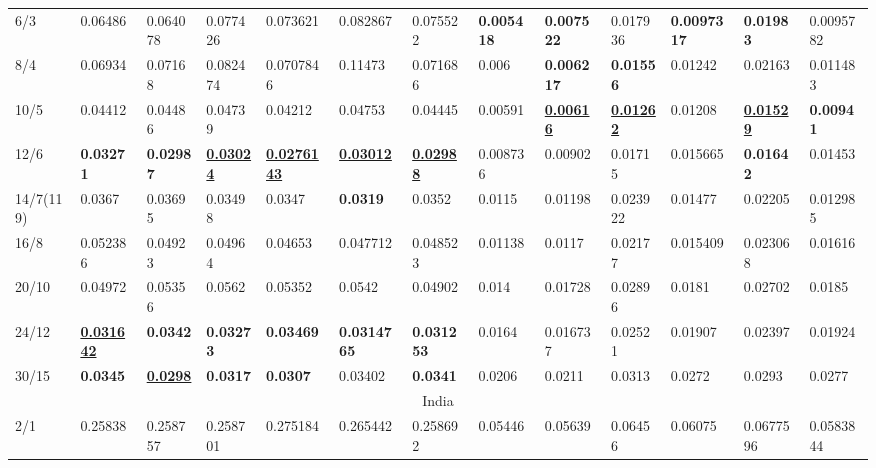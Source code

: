 \begin{landscape}
\begin{table}[]
{\begin{tabular}{@{}lllllllllllll@{}}
6/3 & 0.06486 & 0.064078 & 0.077426 & 0.073621 & 0.082867 & 0.075522 & {\color[HTML]{32CB00} \textbf{0.005418}} & {\color[HTML]{34FF34} \textbf{0.007522}} & 0.017936 & {\color[HTML]{34FF34} \textbf{0.0097317}} & {\color[HTML]{34FF34} \textbf{0.01983}} & 0.0095782 \\
8/4 & 0.06934 & 0.07168 & 0.082474 & 0.0707846 & 0.11473 & 0.071686 & 0.006 & {\color[HTML]{32CB00} \textbf{0.006217}} & {\color[HTML]{34FF34} \textbf{0.01556}} & 0.01242 & 0.02163 & 0.011483 \\
10/5 & 0.04412 & 0.04486 & 0.04739 & 0.04212 & 0.04753 & 0.04445 & 0.00591 & {\color[HTML]{009901} {\ul\textbf{0.00616}}} & {\color[HTML]{009901} {\ul\textbf{0.01262}}} & 0.01208 & {\color[HTML]{009901} {\ul\textbf{0.01529}}} & {\color[HTML]{34FF34} \textbf{0.00941}} \\
12/6 & {\color[HTML]{32CB00} \textbf{0.03271}} & {\color[HTML]{32CB00} \textbf{0.02987}} & {\color[HTML]{009901} {\ul\textbf{0.03024}}} & {\color[HTML]{009901} {\ul\textbf{0.0276143}}} & {\color[HTML]{009901} {\ul\textbf{0.03012}}} & {\color[HTML]{009901} {\ul\textbf{0.02988}}} & 0.008736 & 0.00902 & 0.01715 & 0.015665 & {\color[HTML]{32CB00} \textbf{0.01642}} & 0.01453 \\
14/7(119\textendash0) & 0.0367 & 0.03695 & 0.03498 & 0.0347 & {\color[HTML]{34FF34} \textbf{0.0319}} & 0.0352 & 0.0115 & 0.01198 & 0.023922 & 0.01477 & 0.02205 & 0.012985 \\
16/8 & 0.052386 & 0.04923 & 0.04964 & 0.04653 & 0.047712 & 0.048523 & 0.01138 & 0.0117 & 0.02177 & 0.015409 & 0.023068 & 0.01616 \\
20/10 & 0.04972 & 0.05356 & 0.0562 & 0.05352 & 0.0542 & 0.04902 & 0.014 & 0.01728 & 0.02896 & 0.0181 & 0.02702 & 0.0185 \\
24/12 & {\color[HTML]{009901} {\ul\textbf{0.031642}}} & {\color[HTML]{34FF34} \textbf{0.0342}} & {\color[HTML]{34FF34} \textbf{0.03273}} & {\color[HTML]{34FF34} \textbf{0.03469}} & {\color[HTML]{32CB00} \textbf{0.0314765}} & {\color[HTML]{32CB00} \textbf{0.031253}} & 0.0164 & 0.016737 & 0.02521 & 0.01907 & 0.02397 & 0.01924 \\
30/15 & {\color[HTML]{34FF34} \textbf{0.0345}} & {\color[HTML]{009901} {\ul\textbf{0.0298}}} & {\color[HTML]{32CB00} \textbf{0.0317}} & {\color[HTML]{32CB00} \textbf{0.0307}} & 0.03402 & {\color[HTML]{34FF34} \textbf{0.0341}} & 0.0206 & 0.0211 & 0.0313 & 0.0272 & 0.0293 & 0.0277 \\ \midrule
\multicolumn{13}{c}{India} \\ \midrule
2/1 & 0.25838 & 0.258757 & 0.258701 & 0.275184 & 0.265442 & 0.258692 & 0.05446 & 0.05639 & 0.06456 & 0.06075 & 0.0677596 & 0.0583844 \\

\end{tabular}}
\end{table}
\end{landscape}
